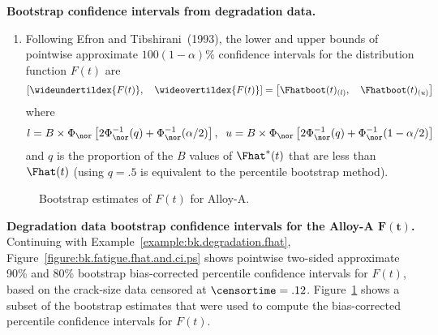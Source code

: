 \begin{algorithm}{\bfseries Bootstrap confidence intervals from
degradation data.}
\begin{enumerate}
\begin{enumerate}
\item
Following Efron and Tibshirani~(1993), 
the lower and upper bounds of pointwise
approximate $100(1-\alpha)\%$ confidence intervals for the distribution
function $F(t)$ are
\begin{displaymath}
\left[ \wideundertildex{F(t)}, \quad
\wideovertildex{F(t)} \right] = 
\left[\Fhatboot(t)_{(l)},  \quad
\Fhatboot(t)_{(u)} \right]
\end{displaymath}
where
\begin{displaymath}
l=B \times \Phi_{\nor}\left[2\Phi_{\nor}^{-1}(q)
+\Phi_{\nor}^{-1}(\alpha/2)\right], \;\; u=B \times
\Phi_{\nor}\left[2\Phi_{\nor}^{-1}(q)+\Phi_{\nor}^{-1}(1-\alpha/2)\right]
\end{displaymath}
and $q$ is the proportion of the $B$ values of  $\Fhat^{*}(t)$
that are less than $\Fhat(t)$ (using $q=.5$ is equivalent to the
percentile bootstrap method).
\end{enumerate}
\end{enumerate}
\end{algorithm}

\begin{figure}
\caption{Bootstrap estimates of $F(t)$ for Alloy-A.}
\label{figure:bk.bootsamples.ps}
\end{figure}

\begin{example}{\bf Degradation data 
bootstrap confidence intervals for the Alloy-A $\boldsymbol{F(t)}$.}
\label{example:bk.degradation.ci}
Continuing with Example~\ref{example:bk.degradation.fhat},
Figure~\ref{figure:bk.fatigue.fhat.and.ci.ps} shows pointwise
two-sided approximate 90\% and 80\% bootstrap bias-corrected
percentile confidence intervals for $F(t)$, based on the crack-size
data censored at $\censortime=.12$.
Figure~\ref{figure:bk.bootsamples.ps} shows a subset of the bootstrap
estimates that were used to compute the bias-corrected percentile
confidence intervals for $F(t)$.
\end{example}

